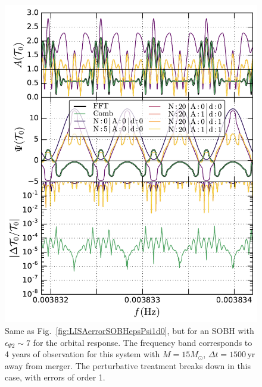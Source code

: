 \documentclass[aps,showpacs,twocolumn,
prd,superscriptaddress,nofootinbib]{revtex4-1}
\newcommand{\yr}{\,\mathrm{yr}}
\newcommand{\Msol}{M_{\odot}}
\begin{document}
\begin{figure}
  \centering
  \includegraphics[width=.98\linewidth]{plots/LISAtransfererrorSOBHepsPsi10d0corr_py.pdf}
  \caption{Same as Fig.~\ref{fig:LISAerrorSOBHepsPsi1d0}, but for an SOBH with $\epsilon_{\Psi 2}\sim 7$ for the orbital response. The frequency band corresponds to 4 years of observation for this system with $M=15\Msol$, $\Delta t = 1500\yr$ away from merger. The perturbative treatment breaks down in this case, with errors of order 1.}
  \label{fig:LISAerrorSOBHepsPsi10d0}
\end{figure}
\end{document}
